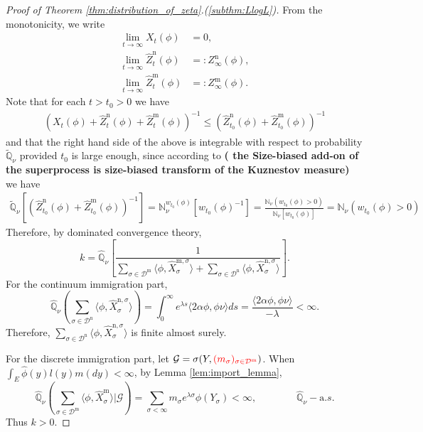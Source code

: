 \documentclass[12pt,a4paper]{amsart}
\numberwithin{equation}{section}
\theoremstyle{plain}
\theoremstyle{definition}
\begin{document}
\begin{proof}[Proof of Theorem \ref{thm:distribution_of_zeta}.(\ref{subthm:LlogL})]
From the monotonicity, we write
\begin{align}
\lim_{t\to \infty} X_t(\phi) &= 0,
\\ \lim_{t\to \infty} \widehat Z_t^{\mathrm n}(\phi) &=: Z_\infty^{\mathrm n}(\phi),
\\ \lim_{t\to \infty} \widehat Z_t^{\mathrm m}(\phi) &=: Z_\infty^{\mathrm m}(\phi). 
\end{align}
Note that for each $t>t_0 > 0 $ we have
\begin{align}
  \left( X_t(\phi) + \widehat Z_t^{\mathrm n}(\phi) + \widehat Z_t^{\mathrm m}(\phi) \right)^{-1} 
    \leq \left( \widehat Z_{t_0}^{\mathrm n}(\phi) + \widehat Z_{t_0}^{\mathrm m}(\phi) \right)^{-1} 
\end{align}
and that the right hand side of the above is integrable with respect to probability $\widetilde {\mathbb Q}_\nu$ provided $t_0$ is large enough, since according to {\bf ( the Size-biased add-on of the superprocess is size-biased transform of the Kuznestov measure)} we have
\begin{align}
  \widetilde {\mathbb Q}_\nu\left[ \left( \widehat Z_{t_0}^{\mathrm n}(\phi) + \widehat Z_{t_0}^{\mathrm m}(\phi) \right)^{-1}  \right]
  = \mathbb N_\nu^{w_{t_0}(\phi)} \left[ w_{t_0}(\phi)^{-1} \right]
  = \frac{\mathbb N_\nu \left(w_{t_0}(\phi) > 0 \right)}{\mathbb N_\nu[w_{t_0}(\phi)]}
  = \mathbb N_\nu \left(w_{t_0}(\phi) > 0 \right)
\end{align}
Therefore, by dominated convergence theory,
  \begin{equation}\label{eq:cons}
    k=\widehat{\mathbb Q}_{\nu}\left[\frac{1}{\sum_{\sigma\in\mathcal D^{\mathrm m}}\langle \phi, \widehat X_{\sigma}^{{\mathrm m},\sigma}\rangle +\sum_{\sigma\in \mathcal D^{\mathrm n}}\langle \phi, \widehat X_{\sigma}^{{\mathrm n},\sigma}\rangle }\right].
  \end{equation}
	For the continuum immigration part,
  \[
    \widehat{\mathbb Q}_{\nu}\left(\sum_{\sigma\in \mathcal D^{\mathrm n}}\langle \phi, \widehat X_{\sigma}^{{\mathrm n},\sigma}\rangle \right)=\int_0^\infty e^{\lambda s}\langle 2\alpha\phi, \phi\nu\rangle  ds=\frac{\langle 2\alpha\phi, \phi\nu\rangle}{-\lambda}<\infty.
  \]
	Therefore, $\sum_{\sigma\in \mathcal D^{\mathrm n}}\langle \phi, \widehat X_{\sigma}^{{\mathrm n},\sigma}\rangle$ is finite almost surely.

	For the discrete immigration part, let $\mathcal G=\sigma(Y, {\color{red}( m_\sigma)_{\sigma\in\mathcal D^{\mathrm m}}})$.  When  $\int_E\widehat{\phi}(y)l(y)m(dy)<\infty$, by Lemma \ref{lem:import_lemma},
  \[
    \widehat{\mathbb Q}_{\nu}\left(\sum_{\sigma\in \mathcal D^{\mathrm m}}\langle \phi, \widehat X_{\sigma}^{{\mathrm m}}\rangle\Big|\mathcal G \right)
    =\sum_{\sigma<\infty}m_\sigma e^{\lambda \sigma}\phi(Y_{\sigma})<\infty,  \qquad\qquad \widehat{\mathbb Q}_{\nu}-{\mathrm a.s.}
  \]
	Thus $k>0$.


\end{proof}
\end{document}
